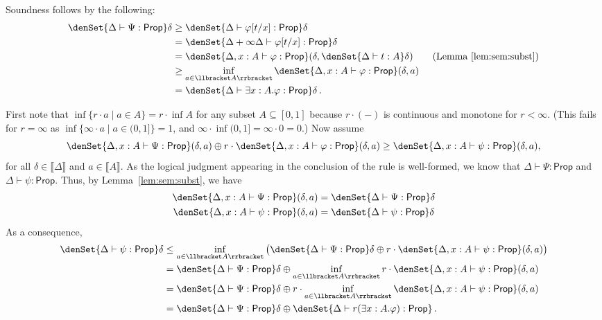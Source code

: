 \documentclass[a4paper,UKenglish,cleveref, autoref, thm-restate]{lipics-v2021}
\newcommand{\uinterval}{[0,1]}
\newcommand{\ts}{\vdash}
\newcommand{\hastype}[3]{#1\ts #2 : #3}
\newcommand{\Prop}{\mathsf{Prop}}
\newcommand{\den}[1]{\llbracket #1\rrbracket}
\begin{document}
\begin{description}[font=\sc,wide]
    \item[Rule ($\exists$-i)] Soundness follows by the following:    \begin{align*}
        \denSet{\hastype{\Delta}{\Psi}{\Prop}}\delta 
        &\geq \denSet{\hastype{\Delta}{\varphi[t/x]}{\Prop}}\delta %
        \\
        &= \denSet{\hastype{\Delta+\infty\Delta}{\varphi[t/x]}{\Prop}}\delta\\
        &=\denSet{\hastype{\Delta,x:A}{\varphi}{\Prop}}
            (\delta,\denSet{\hastype{\Delta}{t}{A}}\delta)
        \tag{Lemma~\ref{lem:sem:subst}}\\
        &\geq \inf_{a\in\den A}
        \denSet{\hastype{\Delta,x:A}{\varphi}{\Prop}}(\delta,a) \\
        &=\denSet{\hastype{\Delta}{\exists x:A.\varphi}{\Prop}}\delta \,.
    \end{align*}
    
    \item[Rule ($\exists$-e):] First note that $\inf\{r\cdot a\mid a\in A\} = r\cdot \inf A$ for any subset $A \subseteq \uinterval$
    because $r \cdot (-)$ is continuous and monotone for $r <\infty$. 
    (This fails for $r = \infty$ as $\inf\{\infty\cdot a\mid a\in (0,1]\} = 1$, and $\infty \cdot \inf (0,1] = \infty \cdot 0 = 0$.)
    Now assume 
    \[\denSet{\hastype{\Delta,x:A}{\Psi}{\Prop}}(\delta,a) \oplus 
    r \cdot\denSet{\hastype{\Delta,x:A}{\varphi}{\Prop}}(\delta,a) \geq \denSet{\hastype{\Delta,x:A}{\psi}{\Prop}}(\delta,a),\] 
    for all $\delta\in\den\Delta$ and $a\in \den{A}$.
    As the logical judgment appearing in the conclusion of the rule 
    is well-formed, we know that $\hastype{\Delta}{\Psi}{\Prop}$ 
    and $\hastype{\Delta}{\psi}{\Prop}$. 
    Thus, by Lemma~\ref{lem:sem:subst}, we have
    \begin{align*}
        \denSet{\hastype{\Delta,x:A}{\Psi}{\Prop}}(\delta,a) & = 
        \denSet{\hastype{\Delta}{\Psi}{\Prop}}\delta \\
        \denSet{\hastype{\Delta,x:A}{\psi}{\Prop}}(\delta,a) & =
        \denSet{\hastype{\Delta}{\psi}{\Prop}}\delta
    \end{align*}
    As a consequence, 
    \begin{align*}
    \denSet{\hastype{\Delta}{\psi}{\Prop}}\delta
    &\leq \inf_{a\in\den{A}} \big(\denSet{\hastype{\Delta}{\Psi}{\Prop}}\delta
    \oplus r\cdot\denSet{\hastype{\Delta,x:A}{\psi}{\Prop}}(\delta,a) \big)
    \\
    &= \denSet{\hastype{\Delta}{\Psi}{\Prop}}\delta
    \oplus \inf_{a\in\den{A}} r\cdot \denSet{\hastype{\Delta,x:A}{\psi}{\Prop}}(\delta,a) \\
    &= \denSet{\hastype{\Delta}{\Psi}{\Prop}}\delta
    \oplus r\cdot\inf_{a\in\den{A}} \denSet{\hastype{\Delta,x:A}{\psi}{\Prop}}(\delta,a) \\
    &= \denSet{\hastype{\Delta}{\Psi}{\Prop}}\delta
    \oplus \denSet{\hastype{\Delta}{r(\exists x:A.\varphi)}{\Prop}} \,.
    \end{align*}


\end{description}
\end{document}

